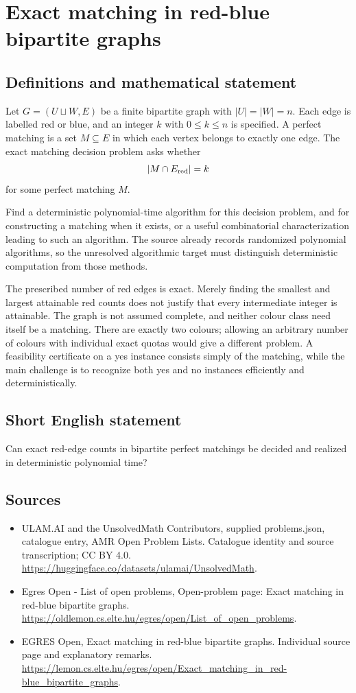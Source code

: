 \documentclass[11pt,a4paper]{article}
\begin{document}
\section*{Exact matching in red-blue bipartite graphs}\label{statement}

\subsection{Definitions and mathematical statement}
Let $G=(U\sqcup W,E)$ be a finite bipartite graph with $|U|=|W|=n$.
Each edge is labelled red or blue, and an integer $k$ with
$0\le k\le n$ is specified. A perfect matching is a set $M\subseteq E$
in which each vertex belongs to exactly one edge. The exact matching
decision problem asks whether
\[
                        |M\cap E_{\rm red}|=k
\]
for some perfect matching $M$.

Find a deterministic polynomial-time algorithm for this decision problem,
and for constructing a matching when it exists, or a useful combinatorial
characterization leading to such an algorithm. The source already
records randomized polynomial algorithms, so the unresolved algorithmic
target must distinguish deterministic computation from those methods.

The prescribed number of red edges is exact. Merely finding the smallest
and largest attainable red counts does not justify that every intermediate
integer is attainable. The graph is not assumed complete, and neither
colour class need itself be a matching. There are exactly two colours;
allowing an arbitrary number of colours with individual exact quotas
would give a different problem. A feasibility certificate on a yes
instance consists simply of the matching, while the main challenge is
to recognize both yes and no instances efficiently and deterministically.
\subsection{Short English statement}
Can exact red-edge counts in bipartite perfect matchings be
decided and realized in deterministic polynomial time?
\subsection{Sources}
\begin{itemize}
\item[S1] ULAM.AI and the UnsolvedMath Contributors, supplied problems.json, catalogue entry, AMR Open Problem Lists. Catalogue identity and source transcription; CC BY 4.0.
\url{https://huggingface.co/datasets/ulamai/UnsolvedMath}.
\item[S2] Egres Open - List of open problems, Open-problem page: Exact matching in red-blue bipartite graphs. 
\url{https://oldlemon.cs.elte.hu/egres/open/List_of_open_problems}.
\item[S3] EGRES Open, Exact matching in red-blue bipartite graphs. Individual source page and explanatory remarks.
\url{https://lemon.cs.elte.hu/egres/open/Exact_matching_in_red-blue_bipartite_graphs}.
\end{itemize}
\end{document}
